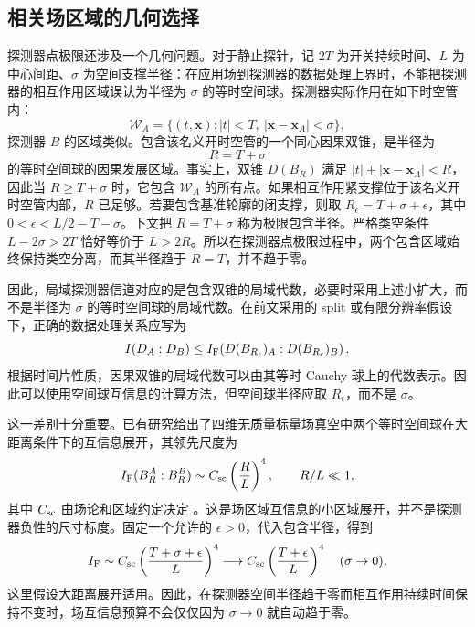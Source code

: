 \documentclass[UTF8,11pt,a4paper,fontset=none]{ctexart}
\begin{document}
\subsection{相关场区域的几何选择}
\label{subsec:detector-region-geometry}

探测器点极限还涉及一个几何问题。对于静止探针，记 $2T$ 为开关持续时间、$L$ 为中心间距、$\sigma$ 为空间支撑半径：在应用场到探测器的数据处理上界时，不能把探测器的相互作用区域误认为半径为 $\sigma$ 的等时空间球。探测器实际作用在如下时空管内：
\begin{equation}
\mathcal W_A=\{(t,\mathbf x): |t|<T,\ 
|\mathbf x-\mathbf x_A|<\sigma\},
\label{eq:detector-worldtube}
\end{equation}
探测器 $B$ 的区域类似。包含该名义开时空管的一个同心因果双锥，是半径为
\begin{equation}
R=T+\sigma
\label{eq:enclosing-doublecone-radius}
\end{equation}
的等时空间球的因果发展区域。事实上，双锥 $D(B_R)$ 满足 $|t|+|\mathbf x-\mathbf x_A|<R$，因此当 $R\geq T+\sigma$ 时，它包含 $\mathcal W_A$ 的所有点。如果相互作用紧支撑位于该名义开时空管内部，$R$ 已足够。若要包含基准轮廓的闭支撑，则取 $R_\epsilon=T+\sigma+\epsilon$，其中 $0<\epsilon<L/2-T-\sigma$。下文把 $R=T+\sigma$ 称为极限包含半径。严格类空条件 $L-2\sigma>2T$ 恰好等价于 $L>2R$。所以在探测器点极限过程中，两个包含区域始终保持类空分离，而其半径趋于 $R=T$，并不趋于零。

因此，局域探测器信道对应的是包含双锥的局域代数，必要时采用上述小扩大，而不是半径为 $\sigma$ 的等时空间球的局域代数。在前文采用的 split 或有限分辨率假设下，正确的数据处理关系应写为
\begin{equation}
I(D_A:D_B)\leq
I_{\rm F}\!\left(D(B_{R_\epsilon})_A:
D(B_{R_\epsilon})_B\right).
\label{eq:correct-doublecone-dpi}
\end{equation}
根据时间片性质，因果双锥的局域代数可以由其等时 Cauchy 球上的代数表示。因此可以使用空间球互信息的计算方法，但空间球半径应取 $R_\epsilon$，而不是 $\sigma$。

这一差别十分重要。已有研究给出了四维无质量标量场真空中两个等时空间球在大距离条件下的互信息展开，其领先尺度为
\begin{equation}
I_{\rm F}(B_R^A:B_R^B)
\sim C_{\rm sc}\left(\frac{R}{L}\right)^4,
\qquad R/L\ll1,
\label{eq:small-ball-mi-scaling}
\end{equation}
其中 $C_{\rm sc}$ 由场论和区域约定决定 \cite{Chen2017CFTMI,AgonCasiniGursoyPlanella2025}。这是场区域互信息的小区域展开，并不是探测器负性的尺寸标度。固定一个允许的 $\epsilon>0$，代入包含半径，得到
\begin{equation}
I_{\rm F}\sim C_{\rm sc}
\left(\frac{T+\sigma+\epsilon}{L}\right)^4
\longrightarrow
C_{\rm sc}\left(\frac{T+\epsilon}{L}\right)^4
\quad (\sigma\to0),
\label{eq:worldtube-enclosing-mi-limit}
\end{equation}
这里假设大距离展开适用。因此，在探测器空间半径趋于零而相互作用持续时间保持不变时，场互信息预算不会仅仅因为 $\sigma\to0$ 就自动趋于零。
\end{document}
